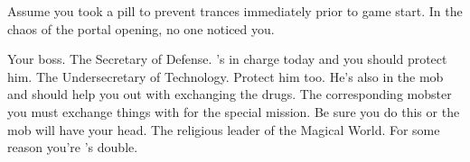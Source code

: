 \documentclass[char]{guildcamp3}
\begin{document}
\begin{itemz}[Notes]
  \item Assume you took a pill to prevent trances immediately prior to game start. In the chaos of the portal opening, no one noticed you. 
\end{itemz}


\begin{contacts}
  \contact{\cSpecOpOne{}} Your boss.
  \contact{\cPoliOne{}} The Secretary of Defense. 's in charge today and you should protect him.
  \contact{\cPoliTwo{}} The Undersecretary of Technology. Protect him too. He's also in the mob and should help you out with exchanging the drugs. 
  \contact{\cServant{}} The corresponding mobster you must exchange things with for the special mission. Be sure you do this or the mob will have your head.
  \contact{\cPaladin{}} The religious leader of the Magical World. For some reason you're \cPaladin{}'s double. 
\end{contacts}
\end{document}
